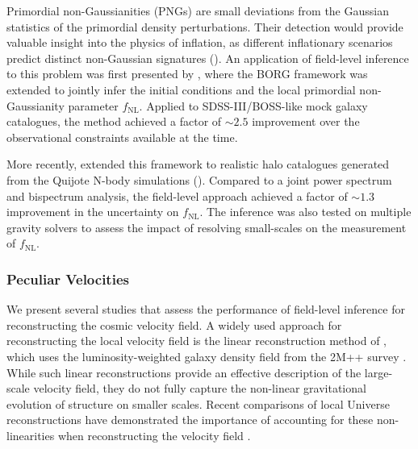 Primordial non-Gaussianities (PNGs) are small deviations from the Gaussian statistics of the primordial density perturbations. 
Their detection would provide valuable insight into the physics of inflation, as different inflationary scenarios predict distinct non-Gaussian signatures (\cite{Chen_2010}). 
An application of field-level inference to this problem was first presented by \cite{Andrews_2023}, where the BORG framework was extended to 
jointly infer the initial conditions and the local primordial non-Gaussianity parameter $f_{\text{NL}}$. 
Applied to SDSS-III/BOSS-like mock galaxy catalogues, the method achieved a factor of $\sim2.5$ improvement over the observational constraints available at the time.

More recently, \cite{Andrews_2026} extended this framework to realistic halo catalogues generated from the Quijote N-body simulations (\cite{Villaescusa_2020}). 
Compared to a joint power spectrum and bispectrum analysis, the field-level approach achieved a factor of $\sim1.3$ improvement in the 
uncertainty on $f_{\text{NL}}$. The inference was also tested on multiple gravity solvers to assess the impact of resolving small-scales on the measurement of $f_{\text{NL}}$.


\subsubsection{Peculiar Velocities}


We present several studies that assess the performance of field-level inference for reconstructing the cosmic velocity field. 
A widely used approach for reconstructing the local velocity field is the linear reconstruction method of \cite{Carrick_2015}, 
which uses the luminosity-weighted galaxy density field from the 2M++ survey \cite{Lavaux_2011}. 
While such linear reconstructions provide an effective description of the large-scale velocity field, they do not fully capture the non-linear gravitational 
evolution of structure on smaller scales. 
Recent comparisons of local Universe reconstructions have demonstrated the importance of 
accounting for these non-linearities when reconstructing the velocity field \cite{Stiskalek_2025_b}. 


